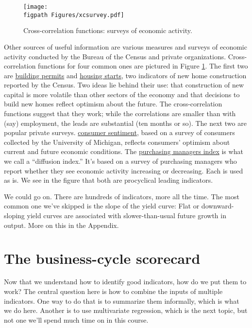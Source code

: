 \begin{figure}
     \caption{Cross-correlation functions:  surveys of economic activity.}
    \label{fig:ccf-survey}%
    \centering
    \texttt{[image: \\figpath Figures/xcsurvey.pdf]}
\end{figure}

Other sources of useful information are various measures and surveys
of economic activity conducted by the Bureau of the Census and
private organizations.
Cross-correlation functions for four common ones are pictured in
Figure \ref{fig:ccf-survey}.
The first two are \href{http://research.stlouisfed.org/fred2/series/PERMIT}{building permits} and \href{http://research.stlouisfed.org/fred2/series/HOUST}{housing starts},
two indicators of new home construction reported by the Census.
Two ideas lie behind their use:
that construction of new capital is more volatile than other sectors
of the economy
and that decisions to build new homes reflect optimism about the future.
The cross-correlation functions suggest that they work;
while the correlations are
smaller than with (say) employment, the leads are substantial
(ten months or so).
The next two are popular private surveys.
\href{http://research.stlouisfed.org/fred2/series/UMCSENT}{consumer sentiment}, based on a survey of consumers
collected by the University of Michigan, reflects consumers' optimism about current and future economic conditions.
The \href{http://research.stlouisfed.org/fred2/series/NAPM}{purchasing managers index} is what we call a ``diffusion index.''
It's based on a survey of purchasing managers who report whether
they see economic activity increasing or decreasing.
Each is used as is.
We see in the figure that both are procyclical 
 leading indicators.

We could go on.  There are hundreds of indicators, more all the time.
The most common one we've skipped is the slope of the yield 
 curve:
Flat or downward-sloping yield 
 curves are associated with slower-than-usual
future growth in output. More on this in the Appendix.


\section{The business-cycle scorecard }

Now that we understand how to identify good indicators,
how do we put them to work?
The central question here is how to combine the inputs of multiple indicators.
One way to do that is to summarize them informally, which is what we do here.
Another is to use multivariate regression, which is the next topic,
but not one we'll spend much time on in this course.

